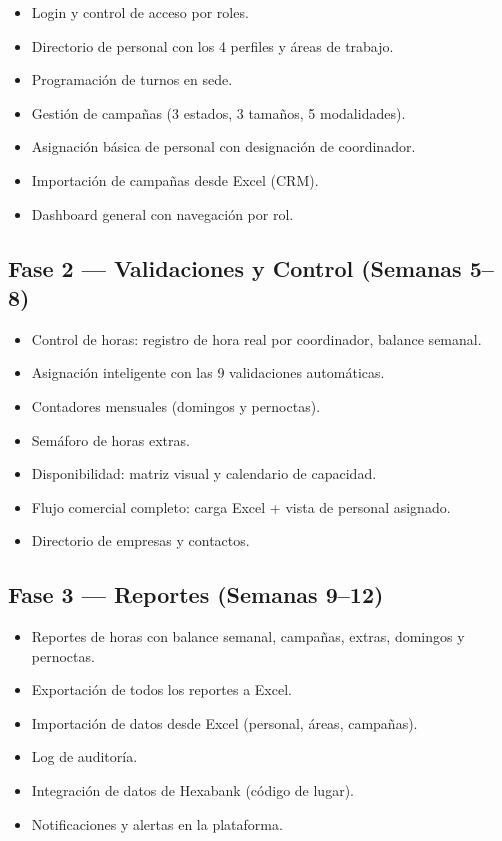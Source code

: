 \documentclass[9pt,a4paper]{extarticle}
\begin{document}
\begin{itemize}[leftmargin=2em]
    \item Login y control de acceso por roles.
    \item Directorio de personal con los 4 perfiles y \'{a}reas de trabajo.
    \item Programaci\'{o}n de turnos en sede.
    \item Gesti\'{o}n de campañas (3 estados, 3 tamaños, 5 modalidades).
    \item Asignaci\'{o}n b\'{a}sica de personal con designaci\'{o}n de coordinador.
    \item Importaci\'{o}n de campañas desde Excel (CRM).
    \item Dashboard general con navegaci\'{o}n por rol.
\end{itemize}

\subsection{Fase 2 --- Validaciones y Control (Semanas 5--8)}

\begin{itemize}[leftmargin=2em]
    \item Control de horas: registro de hora real por coordinador, balance semanal.
    \item Asignaci\'{o}n inteligente con las 9 validaciones autom\'{a}ticas.
    \item Contadores mensuales (domingos y pernoctas).
    \item Sem\'{a}foro de horas extras.
    \item Disponibilidad: matriz visual y calendario de capacidad.
    \item Flujo comercial completo: carga Excel + vista de personal asignado.
    \item Directorio de empresas y contactos.
\end{itemize}

\subsection{Fase 3 --- Reportes (Semanas 9--12)}

\begin{itemize}[leftmargin=2em]
    \item Reportes de horas con balance semanal, campañas, extras, domingos y pernoctas.
    \item Exportaci\'{o}n de todos los reportes a Excel.
    \item Importaci\'{o}n de datos desde Excel (personal, \'{a}reas, campañas).
    \item Log de auditor\'{i}a.
    \item Integraci\'{o}n de datos de Hexabank (c\'{o}digo de lugar).
    \item Notificaciones y alertas en la plataforma.
\end{itemize}
\end{document}
